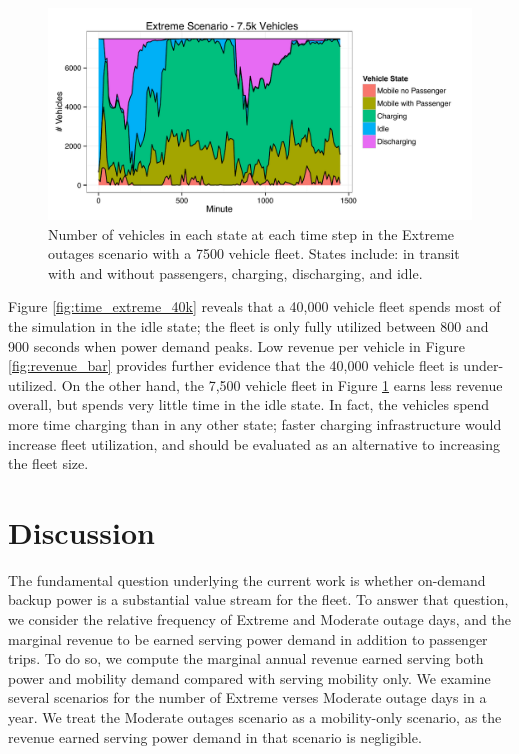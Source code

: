 \documentclass[journal]{IEEEtran}
\begin{document}
\begin{figure}[!htbp]
  \includegraphics[width=\linewidth]{plots/states-area-7500.pdf}
  \caption{Number of vehicles in each state at each time step in the Extreme outages scenario with a 7500 vehicle fleet. States include: in transit with and without passengers, charging, discharging, and idle.}
  \label{fig:time_extreme_7500}
\end{figure}

Figure \ref{fig:time_extreme_40k} reveals that a 40,000 vehicle fleet spends most of the simulation in the idle state; the fleet is only fully utilized between 800 and 900 seconds when power demand peaks. Low revenue per vehicle in Figure \ref{fig:revenue_bar} provides further evidence that the 40,000 vehicle fleet is under-utilized. On the other hand, the 7,500 vehicle fleet in Figure \ref{fig:time_extreme_7500} earns less revenue overall, but spends very little time in the idle state. In fact, the vehicles spend more time charging than in any other state; faster charging infrastructure would increase fleet utilization, and should be evaluated as an alternative to increasing the fleet size.


\section{Discussion}

The fundamental question underlying the current work is whether on-demand backup power is a substantial value stream for the fleet. To answer that question, we consider the relative frequency of Extreme and Moderate outage days, and the marginal revenue to be earned serving power demand in addition to passenger trips. To do so, we compute the marginal annual revenue earned serving both power and mobility demand compared with serving mobility only. We examine several scenarios for the number of Extreme verses Moderate outage days in a year. We treat the Moderate outages scenario as a mobility-only scenario, as the revenue earned serving power demand in that scenario is negligible. 
\end{document}
